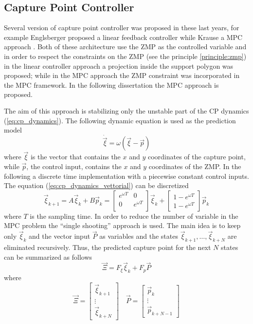 \subsection{Capture Point Controller}
Several version of capture point controller was proposed in these last years,
for example Englsberger proposed a linear feedback controller \cite{Englsberger2011}
while Krause a MPC approach \cite{Krause2012}.
Both of these architecture use the ZMP as the controlled variable and in order to respect the
constraints on the ZMP (see the principle \ref{principle:zmp}) in the linear controller approach
a projection inside the support polygon was proposed; while in the MPC approach the ZMP constraint
was incorporated in the MPC framework.
In the following dissertation the MPC approach is proposed.
\par
The aim of this approach is stabilizing only the unstable part of the CP dynamics
(\ref{eq:cp_dynamics}). The following dynamic equation is used as the prediction model
\begin{equation}
  \label{eq:cp_dynamics_vettorial}
  \dot{\vec{\xi}} = \omega(\vec{\xi} - \vec{p})
\end{equation}
where $\vec{\xi}$ is the vector that contains the $x$ and $y$ coordinates of the capture point,
while $\vec{p}$, the control input, contains the  $x$ and $y$ coordinates of the ZMP.
In the following a discrete time implementation with a piecewise constant control inputs.
The equation (\ref{eq:cp_dynamics_vettorial}) can be discretized
\[
\vec{\xi}_{k+1} = A \vec{\xi}_{k} + B \vec{p}_{k} =
\begin{bmatrix}
  e^{\omega T} & 0 \\
  0 & e^{\omega T} \\
\end{bmatrix}
\vec{\xi}_{k} +
\begin{bmatrix}
  1-e^{\omega T} \\
  1-e^{\omega T}
\end{bmatrix}
\vec{p}_{k} 
\]
where $T$ is the sampling time. In order to reduce the number of variable in the MPC problem the
``single shooting'' approach is used. The main idea is to keep only $\vec{\xi}_k$ and the vector
input $\vec{P}$ as variables and the states $\vec{\xi}_{k + 1}, \dots, \vec{\xi}_{k + N}$ are eliminated recursively.
Thus, the predicted capture point for the next $N$ states can be summarized as follows
\[
\vec{\Xi} = F_{\xi} \vec{\xi}_k + F_{p} \vec{P}
\]
where
\[
\vec{\Xi} =
\begin{bmatrix}
  \vec{\xi}_{k+1}\\
  \vdots\\
  \vec{\xi}_{k+N}
\end{bmatrix} \quad
\vec{P} =
\begin{bmatrix}
  \vec{p}_{k}\\
  \vdots\\
  \vec{p}_{k+N-1}
\end{bmatrix}
\]
